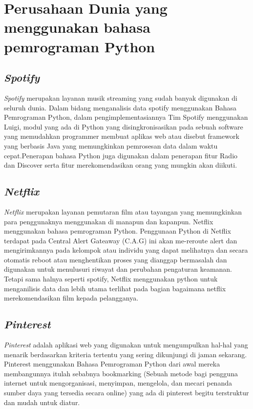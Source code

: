 \chapter*{Perusahaan Dunia yang menggunakan bahasa pemrograman Python}

\section*{\textit{Spotify}}
\par
\textit{Spotify} merupakan layanan musik streaming yang sudah banyak digunakan di seluruh dunia. Dalam bidang menganalisis data spotify menggunakan Bahasa Pemrograman Python, dalam pengimplementasiannya Tim Spotify menggunakan Luigi, modul yang ada di Python yang disingkronisasikan pada sebuah software yang memudahkan programmer membuat aplikas web atau disebut framework yang berbasis Java yang memungkinkan pemrosesan data dalam waktu cepat.Penerapan bahasa Python juga digunakan dalam penerapan fitur Radio dan Discover serta fitur merekomendasikan orang yang mungkin akan diikuti.

\section*{\textit{Netflix}}
\par
\textit{Netflix} merupakan layanan pemutaran film atau tayangan yang memungkinkan para penggunaknya menggunakan di manapun dan kapanpun. Netflix menggunakan bahasa pemrograman Python. Penggunaan Python di Netflix terdapat pada Central Alert Gateaway (C.A.G) ini akan me-reroute alert dan mengirimkannya pada kelompok atau individu yang dapat melihatnya dan secara otomatis reboot atau menghentikan proses yang dianggap bermasalah dan digunakan untuk menulusuri riwayat dan perubahan pengaturan keamanan. Tetapi sama halnya seperti spotify, Netflix menggunakan python untuk menganilisis data dan lebih utama terlihat pada bagian bagaimana netflix merekomendasikan film kepada pelangganya.

\section*{\textit{Pinterest}}
\par
\textit{Pinterest} adalah aplikasi web yang digunakan untuk mengumpulkan hal-hal yang menarik berdasarkan kriteria tertentu yang sering dikunjungi di jaman sekarang. Pinterest menggunakan Bahasa Pemrograman Python dari awal mereka membangunnya itulah sebabnya bookmarking (Sebuah metode bagi pengguna internet untuk mengorganisasi, menyimpan, mengelola, dan mecari penanda sumber daya yang tersedia secara online) yang ada di pinterest begitu terstruktur dan mudah untuk diatur.

